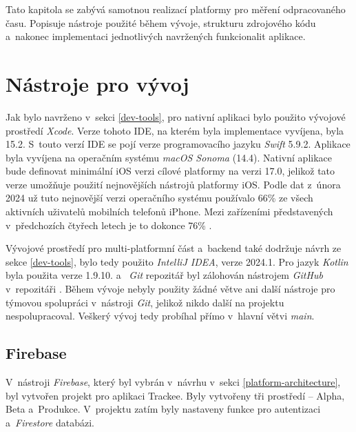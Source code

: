 Tato kapitola se zabývá samotnou realizací platformy pro měření odpracovaného času. Popisuje nástroje použité během vývoje, strukturu zdrojového kódu a~nakonec implementaci jednotlivých navržených funkcionalit aplikace.

\section{Nástroje pro vývoj}\label{development-tools}

Jak bylo navrženo v~sekci \ref{dev-tools}, pro nativní aplikaci bylo použito vývojové prostředí \emph{Xcode}. Verze tohoto IDE, na kterém byla implementace vyvíjena, byla 15.2. S~touto verzí IDE se pojí verze programovacího jazyku \emph{Swift} 5.9.2. Aplikace byla vyvíjena na operačním systému \emph{macOS Sonoma} (14.4). Nativní aplikace bude definovat minimální iOS verzi cílové platformy na verzi 17.0, jelikož tato verze umožňuje použití nejnovějších nástrojů platformy iOS. Podle dat z~února 2024 už tuto nejnovější verzi operačního systému používalo 66\% ze všech aktivních uživatelů mobilních telefonů iPhone. Mezi zařízeními představených v~předchozích čtyřech letech je to dokonce 76\% \cite{ios-17-adoption}.

Vývojové prostředí pro multi-platformní část a~backend také dodržuje návrh ze sekce \ref{dev-tools}, bylo tedy použito \emph{IntelliJ IDEA}, verze 2024.1. Pro jazyk \emph{Kotlin} byla použita verze 1.9.10. 
 a~
\emph{Git} repozitář byl zálohován nástrojem \emph{GitHub} \cite{github} v~repozitáři \cite{trackee-app-github}. Během vývoje nebyly použity žádné větve ani další nástroje pro týmovou spolupráci v~nástroji \emph{Git}, jelikož nikdo další na projektu nespolupracoval. Veškerý vývoj tedy probíhal přímo v~hlavní větvi \emph{main}.

\subsection{Firebase}

V~nástroji \emph{Firebase}, který byl vybrán v~návrhu v~sekci \ref{platform-architecture}, byl vytvořen projekt pro aplikaci Trackee. Byly vytvořeny tři prostředí – Alpha, Beta a~Produkce. V~projektu zatím byly nastaveny funkce pro autentizaci a~\emph{Firestore} databázi. 


